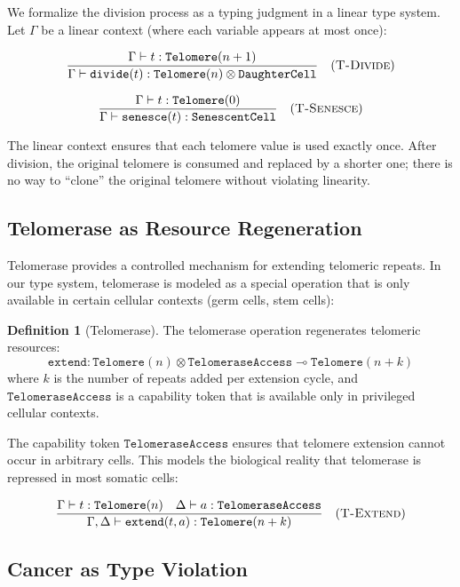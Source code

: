 \documentclass[12pt,a4paper]{article}
\theoremstyle{plain}
\theoremstyle{definition}
\newtheorem{definition}[theorem]{Definition}
\begin{document}
We formalize the division process as a typing judgment in a linear type system. Let $\Gamma$ be a linear context (where each variable appears at most once):

\[
\frac{\Gamma \vdash t : \texttt{Telomere}(n+1)}{\Gamma \vdash \texttt{divide}(t) : \texttt{Telomere}(n) \otimes \texttt{DaughterCell}}
\quad (\textsc{T-Divide})
\]

\[
\frac{\Gamma \vdash t : \texttt{Telomere}(0)}{\Gamma \vdash \texttt{senesce}(t) : \texttt{SenescentCell}}
\quad (\textsc{T-Senesce})
\]

The linear context ensures that each telomere value is used exactly once. After division, the original telomere is consumed and replaced by a shorter one; there is no way to ``clone'' the original telomere without violating linearity.

\subsection{Telomerase as Resource Regeneration}

Telomerase provides a controlled mechanism for extending telomeric repeats. In our type system, telomerase is modeled as a special operation that is only available in certain cellular contexts (germ cells, stem cells):

\begin{definition}[Telomerase]\label{def:telomerase}
The telomerase operation regenerates telomeric resources:
\[
  \texttt{extend} : \texttt{Telomere}(n) \otimes \texttt{TelomeraseAccess} \multimap \texttt{Telomere}(n+k)
\]
where $k$ is the number of repeats added per extension cycle, and $\texttt{TelomeraseAccess}$ is a capability token that is available only in privileged cellular contexts.
\end{definition}

The capability token $\texttt{TelomeraseAccess}$ ensures that telomere extension cannot occur in arbitrary cells. This models the biological reality that telomerase is repressed in most somatic cells:

\[
\frac{\Gamma \vdash t : \texttt{Telomere}(n) \quad \Delta \vdash a : \texttt{TelomeraseAccess}}{\Gamma, \Delta \vdash \texttt{extend}(t, a) : \texttt{Telomere}(n+k)}
\quad (\textsc{T-Extend})
\]

\subsection{Cancer as Type Violation}
\end{document}
